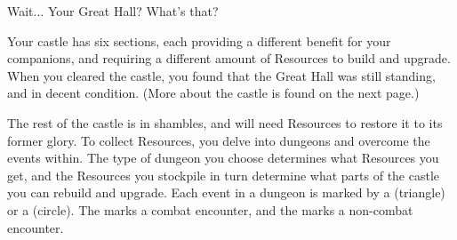 Wait... Your Great Hall? What’s that?

\pagebreak

Your castle has six sections, each providing a different benefit for your companions, and requiring a different amount of Resources to build and upgrade. When you cleared the castle, you found that the Great Hall was still standing, and in decent condition. (More about the castle is found on the next page.)

\skipline

The rest of the castle is in shambles, and will need Resources to restore it to its former glory. 
To collect Resources, you delve into dungeons and overcome the events within. The type of dungeon you choose determines what Resources you get, and the Resources you stockpile in turn determine what parts of the castle you can rebuild and upgrade. Each event in a dungeon is marked by a \tripip  (triangle) or a \cirpip (circle). The \tripip marks a combat encounter, and the \cirpip marks a non-combat encounter.